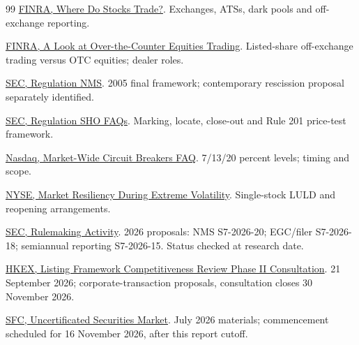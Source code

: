 \documentclass[11pt,a4paper]{article}
\begin{document}
\begin{thebibliography}{99}
 \href{https://www.finra.org/investors/insights/where-do-stocks-trade}{FINRA, Where Do Stocks Trade?}. Exchanges, ATSs, dark pools and off-exchange reporting.

 \href{https://www.finra.org/investors/insights/over-the-counter-equities-trading}{FINRA, A Look at Over-the-Counter Equities Trading}. Listed-share off-exchange trading versus OTC equities; dealer roles.

 \href{https://www.sec.gov/rules-regulations/2005/06/regulation-nms}{SEC, Regulation NMS}. 2005 final framework; contemporary rescission proposal separately identified.

 \href{https://www.sec.gov/rules-regulations/staff-guidance/trading-markets-frequently-asked-questions-8}{SEC, Regulation SHO FAQs}. Marking, locate, close-out and Rule 201 price-test framework.

 \href{https://beta.nasdaqtrader.com/content/marketregulation/mwcb_faq.pdf}{Nasdaq, Market-Wide Circuit Breakers FAQ}. 7/13/20 percent levels; timing and scope.

 \href{https://www.nyse.com/network/article/nyse-increases-resiliancy-during-extreme-volatility}{NYSE, Market Resiliency During Extreme Volatility}. Single-stock LULD and reopening arrangements.

 \href{https://www.sec.gov/rules-regulations/rulemaking-activity}{SEC, Rulemaking Activity}. 2026 proposals: NMS S7-2026-20; EGC/filer S7-2026-18; semiannual reporting S7-2026-15. Status checked at research date.

 \href{https://www.hkex.com.hk/News/Regulatory-Announcements/2026/260921news?sc_lang=en}{HKEX, Listing Framework Competitiveness Review Phase II Consultation}. 21 September 2026; corporate-transaction proposals, consultation closes 30 November 2026.

 \href{https://www.sfc.hk/en/Rules-and-standards/Uncertificated-Securities-Market}{SFC, Uncertificated Securities Market}. July 2026 materials; commencement scheduled for 16 November 2026, after this report cutoff.

\end{thebibliography}
\end{document}
